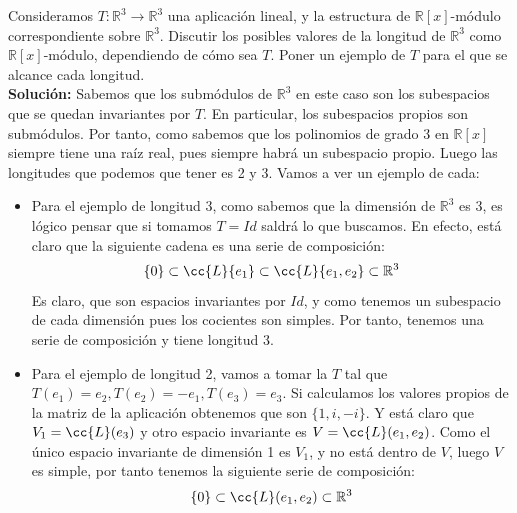 \begin{ejerciciostar}
    Consideramos $T:\mathbb{R}^3 \to \mathbb{R}^3$ una aplicación lineal, y la estructura de $\mathbb{R}[x]$-módulo correspondiente sobre $\mathbb{R}^3$. Discutir los posibles valores de la longitud de $\mathbb{R}^3$ como $\mathbb{R}[x]$-módulo, dependiendo de cómo sea $T$. Poner un ejemplo de $T$ para el que se alcance cada longitud. \\
    
    \noindent
    \textbf{Solución:}
    Sabemos que los submódulos de $\mathbb{R}^3$ en este caso son los subespacios que se quedan invariantes por $T$. En particular, los subespacios propios son submódulos. Por tanto, como sabemos que los polinomios de grado 3 en $\mathbb{R}[x]$ siempre tiene una raíz real, pues siempre habrá un subespacio propio. Luego las longitudes que podemos que tener es 2 y 3. Vamos a ver un ejemplo de cada:
    \begin{itemize}
        \item Para el ejemplo de longitud 3, como sabemos que la dimensión de $\mathbb{R}^3$ es 3, es lógico pensar que si tomamos $T = Id$ saldrá lo que buscamos. En efecto, está claro que la siguiente cadena es una serie de composición:
            \begin{equation*}
                \{0\} \subset \cc{L}\{e_1\} \subset \cc{L}\{e_1, e_2\} \subset \mathbb{R}^3
            \end{equation*}
        Es claro, que son espacios invariantes por $Id$, y como tenemos un subespacio de cada dimensión pues los cocientes son simples. Por tanto, tenemos una serie de composición y tiene longitud 3. 
    \item Para el ejemplo de longitud 2, vamos a tomar la $T$ tal que $T(e_1) = e_2, T(e_2)=-e_1, T(e_3) = e_3$. Si calculamos los valores propios de la matriz de la aplicación obtenemos que son $\{1, i, -i\}$. Y está claro que $V_1 = \cc{L}(e_3)$ y otro espacio invariante es $V = \cc{L}(e_1, e_2)$. Como el único espacio invariante de dimensión 1 es $V_1$, y no está dentro de $V$, luego $V$ es simple, por tanto tenemos la siguiente serie de composición:
        \begin{equation*}
            \{0\} \subset \cc{L}(e_1, e_2) \subset \mathbb{R}^3
        \end{equation*}
    \end{itemize}
\end{ejerciciostar}

